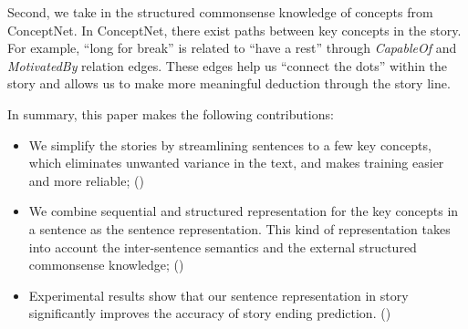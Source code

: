 Second, we take in the structured commonsense knowledge of concepts from ConceptNet.
In ConceptNet, there exist paths between key concepts in the story.
For example, ``long for break'' is related to ``have a rest''
through {\em CapableOf} and {\em MotivatedBy} relation edges.
These edges help us ``connect the dots'' within the story and allows us
to make more meaningful deduction through the story line.

In summary, this paper makes the following contributions:
\begin{itemize}
\item We simplify the stories by streamlining sentences to a few
key concepts, which eliminates unwanted variance in the text,
and makes training easier and more reliable;
()
\item We combine sequential and structured representation for the key concepts
in a sentence as the sentence representation.
This kind of representation takes into account the inter-sentence semantics
and the external structured commonsense knowledge; ()
\item Experimental results show that our sentence representation in story
significantly improves the accuracy of story ending prediction. ()
\end{itemize}

